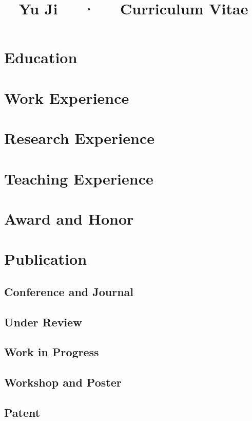\documentclass[sans]{modularcv}
\title{Yu Ji~~~·~~~Curriculum Vitae}
\begin{document}
\makecvheader
\makefooter

\section{Education}
\makeEducation

\section{Work Experience}
\makeWorkExperience

\section{Research Experience}
\makeResearchExperience

\section{Teaching Experience}
\makeTeaching

\section{Award and Honor}
\makeAward

\section{Publication}
\subsection{Conference and Journal}

\subsection{Under Review}

\subsection{Work in Progress}

\subsection{Workshop and Poster}

\subsection{Patent}
\end{document}

